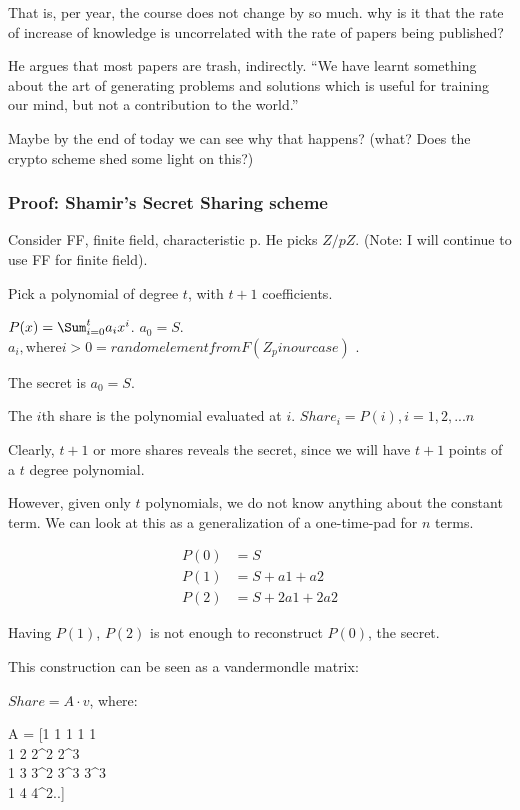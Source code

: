 That is, per year, the course does not change by so much. why is it that the rate of increase of knowledge is
uncorrelated with the rate of papers being published?

He argues that most papers are trash, indirectly. ``We have learnt something about the art of generating
problems and solutions which is useful for training our mind, but not a contribution to the world.''

Maybe by the end of today we can see why that happens? (what? Does the crypto scheme shed some light on this?)

\subsubsection{Proof: Shamir's Secret Sharing scheme}
Consider FF, finite field, characteristic p. He picks $Z/pZ$. (Note: I will continue to use FF for finite field).

Pick a polynomial of degree $t$, with $t + 1$ coefficients.

$P(x) = \Sum_{i=0}^t a_i x^i$. $a_0 = S$. $a_i, \text{where} i > 0 = random element from F (Z_p in our case) $ .

The secret is $a_0 = S$.

The $i$th share is the polynomial evaluated at $i$.
$ Share_i = P(i), i = 1, 2, ... n$


Clearly, $t + 1$ or more shares reveals the secret, since we will have $t + 1$ points of a $t$ degree polynomial.

However, given only $t$ polynomials, we do not know anything about the constant term. We can look at this as a
generalization of a one-time-pad for $n$ terms.




\begin{align}
P(0) &= S \\
P(1) &= S + a1 + a2 \\
P(2) &= S + 2a1 + 2a2
\end{align}

Having $P(1)$, $P(2)$ is not enough to reconstruct $P(0)$, the secret.


This construction can be seen as a vandermondle matrix:

$Share = A \cdot v$, where:


A = [1 1 1  1 1\\
  1 2 2^2  2^3\\
  1 3 3^2 3^3 3^3 \\
  1 4 4^2..]

